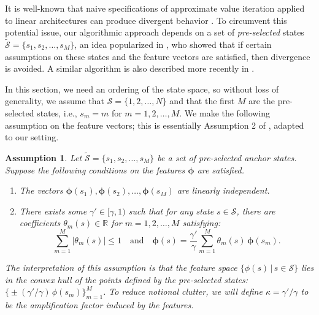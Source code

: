 \documentclass[11pt, notitlepage]{article}
\newcommand{\R}{\mathbb{R}}
\newcommand{\1}{\mathbbm{1}}
\newtheorem{assumption}{Assumption}
\begin{document}
It is well-known that naive specifications of approximate value iteration applied to linear architectures can produce divergent behavior \citep{bertsekas1996neuro}. To circumvent this potential issue, our algorithmic approach depends on a set of \emph{pre-selected} states $\tilde{\mathcal{S}} = \{s_1,s_2,\ldots,s_M\}$, an idea popularized in \cite{tsitsiklis1996feature}, who showed that if certain assumptions on these states and the feature vectors are satisfied, then divergence is avoided. A similar algorithm is also described more recently in \cite{zanette2019limiting}. 

In this section, we need an ordering of the state space, so without loss of generality, we assume that $\mathcal S = \{1, 2, \ldots, N\}$ and that the first $M$ are the pre-selected states, i.e., $s_m = m$ for $m = 1, 2, \ldots, M$. 
We make the following assumption on the feature vectors; this is essentially Assumption 2 of \cite{tsitsiklis1996feature}, adapted to our setting.

\begin{assumption}\label{assumption.basis_function}
Let $\tilde{\mathcal{S}} = \{s_1,s_2,\ldots,s_M\}$ be a set of pre-selected anchor states. Suppose the following conditions on the features $\boldsymbol{\phi}$ are satisfied.
    
    \begin{enumerate}
        \item The vectors $\boldsymbol{\phi}(s_1), \boldsymbol{\phi}(s_2), \ldots, \boldsymbol{\phi}(s_M)$ are linearly independent.
        
        \item There exists some $\gamma' \in [\gamma, 1)$ such that for any state $s\in \mathcal{S}$, there are coefficients $\theta_m(s) \in \R$ for $m=1,2, \ldots, M$  satisfying:
        \[
            \sum_{m=1}^M |\theta_m(s)| \leq 1 \quad \text{and} \quad \boldsymbol{\phi}(s) = \frac{\gamma'}{\gamma} \sum_{m=1}^M \theta_m(s) \, \boldsymbol{\phi}(s_m).
        \]
    \end{enumerate}
The interpretation of this assumption is that the feature space $\{\phi(s) \, | \, s \in \mathcal S\}$ lies in the convex hull of the points defined by the pre-selected states: $\bigl\{\pm (\gamma' / \gamma) \,  \phi(s_m)\bigr\}_{m=1}^M$. To reduce notional clutter, we will define $\kappa = \gamma' / \gamma$ to be the \emph{amplification factor} induced by the features.
\end{assumption}
\end{document}
